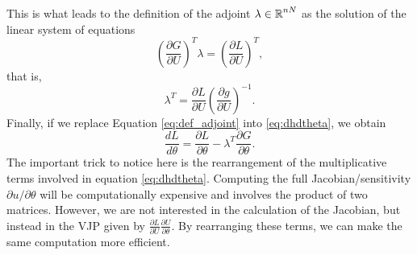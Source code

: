 This is what leads to the definition of the adjoint $\lambda \in \operatorname{\mathbb{R}}^{nN}$ as the solution of the linear system of equations 
\begin{equation}
    \left( \frac{\partial G}{\partial U}\right)^T \lambda 
    =  
    \left( \frac{\partial L}{\partial U} \right)^T,
    \label{eq:adjoint-state-equation}
\end{equation}
that is,
\begin{equation}
    \lambda^T = \frac{\partial L}{\partial U} \left( \frac{\partial g}{\partial U} \right)^{-1}.
    \label{eq:def_adjoint}
\end{equation}
Finally, if we replace Equation \eqref{eq:def_adjoint} into \eqref{eq:dhdtheta}, we obtain 
\begin{equation}
    \frac{dL}{d\theta} 
    =
    \frac{\partial L}{\partial \theta} 
    - 
    \lambda^T \frac{\partial G}{\partial \theta}.
    \label{eq:gradient-adjoint-state-method}
\end{equation}
The important trick to notice here is the rearrangement of the multiplicative terms involved in equation \eqref{eq:dhdtheta}. Computing the full Jacobian/sensitivity $\partial u / \partial \theta$ will be computationally expensive and involves the product of two matrices. However, we are not interested in the calculation of the Jacobian, but instead in the VJP given by $\frac{\partial L}{\partial U} \frac{\partial U}{\partial \theta}$. By rearranging these terms, we can make the same computation more efficient. 

